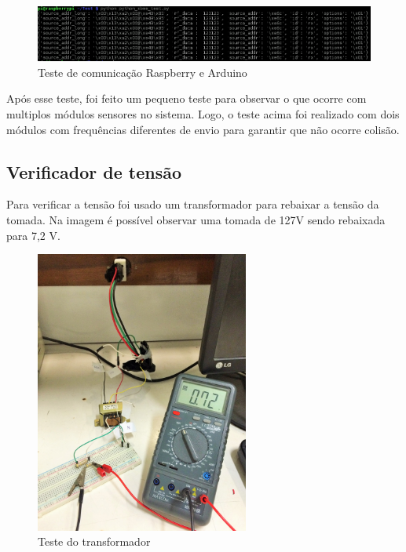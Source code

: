 

\begin{figure}[H]
\centering
\includegraphics[width=1\textwidth]{figuras/teste-inicial-raspberry-arduino.png}
\caption{\label{fig:raspberry-arduino-1} Teste de comunicação Raspberry e Arduino}
\end{figure}

Após esse teste, foi feito um pequeno teste para observar o que ocorre com multiplos módulos sensores no sistema. Logo, o teste acima foi realizado com dois módulos com frequências diferentes de envio para garantir que não ocorre colisão.

\subsection{Verificador de tensão}

Para verificar a tensão foi usado um transformador para rebaixar a tensão da tomada. Na imagem é possível observar uma tomada de 127V sendo rebaixada para 7,2 V.

\begin{figure}[H]
\centering
\includegraphics[width=7cm,keepaspectratio]{figuras/sensor-tensao.jpg} 
\caption{\label{fig:sensor-tensao} Teste do transformador}
\end{figure}

